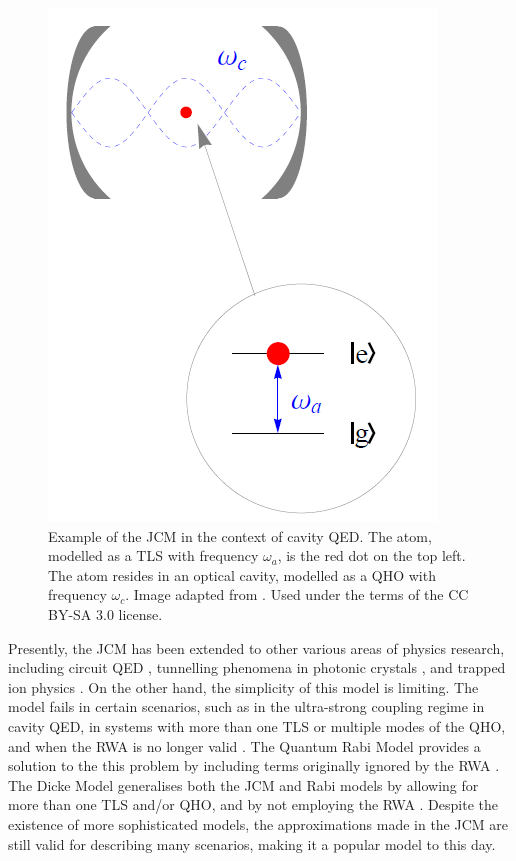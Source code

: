 \documentclass[12pt,a4paper]{article}
\begin{document}
\begin{figure}[h]
    \centering
    \includegraphics[scale=0.6]{Images/Jaynes-Cummings_model.png}
    \caption{Example of the JCM in the context of cavity QED. The atom, modelled as a TLS with frequency $\omega_a$, is the red dot on the top left. The atom resides in an optical cavity, modelled as a QHO with frequency $\omega_c$. Image adapted from \cite{Image-Prince_JCM}. Used under the terms of the CC BY-SA 3.0 license.}
    \label{fig:1_JCM}
\end{figure}

\vspace{0.4cm}

Presently, the JCM has been extended to other various areas of physics research, including circuit QED \cite{Context2018-Supercond_qubit}, tunnelling phenomena in photonic crystals \cite{Context2012-Tunneling_photons}, and trapped ion physics \cite{Context1992-Trapped_ions}. On the other hand, the simplicity of this model is limiting. The model fails in certain scenarios, such as in the ultra-strong coupling regime in cavity QED, in systems with more than one TLS or multiple modes of the QHO, and when the RWA is no longer valid \cite{General2024-JC_overview}. The Quantum Rabi Model provides a solution to the this problem by including terms originally ignored by the RWA \cite{General2024-JC_overview}. The Dicke Model generalises both the JCM and Rabi models by allowing for more than one TLS and/or QHO, and by not employing the RWA \cite{General2024-JC_overview}. Despite the existence of more sophisticated models, the approximations made in the JCM are still valid for describing many scenarios, making it a popular model to this day. 
\end{document}
